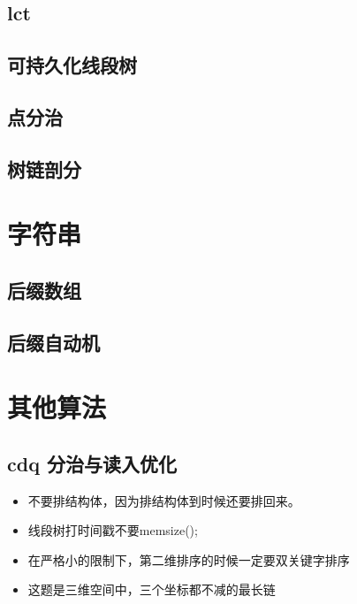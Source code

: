\documentclass[landscape]{report}
\newcommand{\includecode}[2][c]{}
\begin{document}
\begin{flushleft}
\begin{multicols}{2}
\section{lct}
\section{可持久化线段树}
\section{ 点分治}
\section{ 树链剖分}

\chapter{字符串}
\section{ 后缀数组}
\section{后缀自动机}

\chapter{ 其他算法}
\section{ cdq 分治与读入优化}
\begin{itemize}

\item 不要排结构体，因为排结构体到时候还要排回来。
\item 线段树打时间戳不要memsize();
\item 在严格小的限制下，第二维排序的时候一定要双关键字排序
\item 这题是三维空间中，三个坐标都不减的最长链

\end{itemize}
\includecode[c++]{hdu4742.cpp}
\end{multicols}
\end{flushleft}
\end{document}
